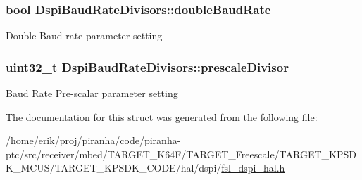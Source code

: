 \subsubsection[{\texorpdfstring{double\+Baud\+Rate}{doubleBaudRate}}]{\setlength{\rightskip}{0pt plus 5cm}bool Dspi\+Baud\+Rate\+Divisors\+::double\+Baud\+Rate}\hypertarget{structDspiBaudRateDivisors_a9033a92322a6c09c14fda53c0a30ee8a}{}\label{structDspiBaudRateDivisors_a9033a92322a6c09c14fda53c0a30ee8a}
Double Baud rate parameter setting 
\subsubsection[{\texorpdfstring{prescale\+Divisor}{prescaleDivisor}}]{\setlength{\rightskip}{0pt plus 5cm}uint32\+\_\+t Dspi\+Baud\+Rate\+Divisors\+::prescale\+Divisor}\hypertarget{structDspiBaudRateDivisors_a251394cd7f2814166f5ec7fe5ea23de0}{}\label{structDspiBaudRateDivisors_a251394cd7f2814166f5ec7fe5ea23de0}
Baud Rate Pre-\/scalar parameter setting 

The documentation for this struct was generated from the following file\+:\begin{DoxyCompactItemize}
\item 
/home/erik/proj/piranha/code/piranha-\/ptc/src/receiver/mbed/\+T\+A\+R\+G\+E\+T\+\_\+\+K64\+F/\+T\+A\+R\+G\+E\+T\+\_\+\+Freescale/\+T\+A\+R\+G\+E\+T\+\_\+\+K\+P\+S\+D\+K\+\_\+\+M\+C\+U\+S/\+T\+A\+R\+G\+E\+T\+\_\+\+K\+P\+S\+D\+K\+\_\+\+C\+O\+D\+E/hal/dspi/\hyperlink{fsl__dspi__hal_8h}{fsl\+\_\+dspi\+\_\+hal.\+h}\end{DoxyCompactItemize}
